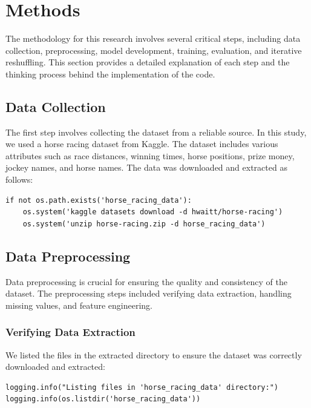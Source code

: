 \documentclass{article}
\begin{document}
\section*{Methods}
The methodology for this research involves several critical steps, including data collection, preprocessing, model development, training, evaluation, and iterative reshuffling. This section provides a detailed explanation of each step and the thinking process behind the implementation of the code.

\subsection*{Data Collection}
The first step involves collecting the dataset from a reliable source. In this study, we used a horse racing dataset from Kaggle. The dataset includes various attributes such as race distances, winning times, horse positions, prize money, jockey names, and horse names. The data was downloaded and extracted as follows:

\begin{verbatim}
if not os.path.exists('horse_racing_data'):
    os.system('kaggle datasets download -d hwaitt/horse-racing')
    os.system('unzip horse-racing.zip -d horse_racing_data')
\end{verbatim}

\subsection*{Data Preprocessing}
Data preprocessing is crucial for ensuring the quality and consistency of the dataset. The preprocessing steps included verifying data extraction, handling missing values, and feature engineering.

\subsubsection*{Verifying Data Extraction}
We listed the files in the extracted directory to ensure the dataset was correctly downloaded and extracted:
\begin{verbatim}
logging.info("Listing files in 'horse_racing_data' directory:")
logging.info(os.listdir('horse_racing_data'))
\end{verbatim}
\end{document}
